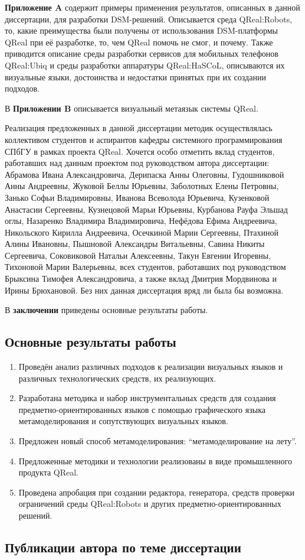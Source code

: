 \textbf{Приложение A} содержит примеры применения результатов, описанных в данной 
диссертации, для разработки DSM-решений. Описывается среда QReal:Robots, то, 
какие преимущества были получены от использования DSM-платформы QReal при её 
разработке, то, чем QReal помочь не смог, и почему. Также приводится 
описание среды разработки сервисов для мобильных телефонов QReal:Ubiq и среды
разработки аппаратуры QReal:HaSCoL, описываются их визуальные языки, 
достоинства и недостатки принятых при их создании подходов.

В \textbf{Приложении B} описывается визуальный метаязык системы QReal.

Реализация предложенных в данной диссертации методик осуществлялась коллективом студентов 
и аспирантов кафедры системного программирования СПбГУ в рамках проекта QReal. Хочется 
особо отметить вклад студентов, работавших над данным проектом под руководством автора 
диссертации: Абрамова Ивана Александровича, Дерипаска Анны Олеговны, Гудошниковой Анны Андреевны, 
Жуковой Беллы Юрьевны, Заболотных Елены Петровны, Занько Софьи Владимировны, Иванова Всеволода Юрьевича, 
Кузенковой Анастасии Сергеевны, Кузнецовой Марьи Юрьевны, Курбанова Рауфа Эльшад оглы, 
Назаренко Владимира Владимировича, Нефёдова Ефима Андреевича, Никольского Кирилла Андреевича, 
Осечкиной Марии Сергеевны, Птахиной Алины Ивановны, Пышновой Александры Витальевны, 
Савина Никиты Сергеевича, Соковиковой Натальи Алексеевны, Такун Евгении Игоревны, 
Тихоновой Марии Валерьевны, всех студентов, работавших под руководством Брыксина Тимофея Александровича, 
а также вклад Дмитрия Мордвинова и Ирины Брюхановой. Без них данная диссертация вряд ли 
была бы возможна.

В \textbf{заключении} приведены основные результаты работы.

\subsection*{\Large Основные результаты работы}
\begin{enumerate}
	\item Проведён анализ различных подходов к реализации визуальных языков и различных 
		технологических средств, их реализующих.
	\item Разработана методика и набор инструментальных средств для  создания предметно-ориентированных 
		языков с помощью графического языка метамоделирования и сопутствующих визуальных языков.
	\item Предложен новый способ метамоделирования: "`метамоделирование на лету"'.
	\item Предложенные методики и технологии реализованы в виде промышленного продукта QReal.
	\item Проведена апробация при создании редактора, генератора, средств проверки ограничений 
		среды QReal:Robots и других предметно-ориентированных решений.
\end{enumerate}

\subsection*{\Large Публикации автора по теме диссертации}


\renewcommand{\refname}{\Large В других изданиях}
\nocite{*}

